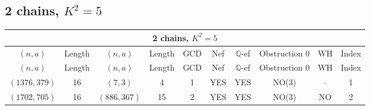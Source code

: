 \subsection{2 chains, $K^2 = 5$}
\begin{longtable}{|c|c|c|c|c|c|c|c|c|c|}
\hline
\multicolumn{10}{|c|}{2 chains, $K^2 = 5$}\\
\hline
$(n,a)$ & Length & $(n,a)$ & Length & GCD & Nef & $\mathbb Q$-ef & Obstruction 0 & WH & Index\\
\hline
\endfirsthead

\hline
$(n,a)$ & Length & $(n,a)$ & Length & GCD & Nef & $\mathbb Q$-ef & Obstruction 0 & WH & Index\\
\hline
\endhead
\hline
\endfoot

$(1376, 379)$ & 16 & $(7, 3)$ & 4 & 1 & YES & YES & NO(3) & -- & 1\\
$(1702, 705)$ & 16 & $(886, 367)$ & 15 & 2 & YES & YES & NO(3) & NO & 2
\end{longtable}

